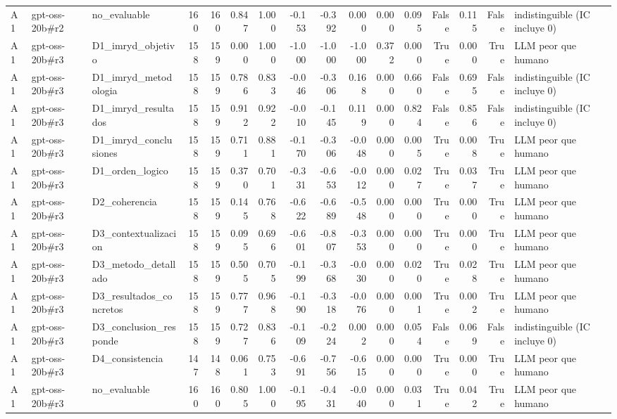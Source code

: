 \begin{table}
{\begin{tabular}{lllrrrrrrrrrrrrl}
A1 & gpt-oss-20b\#r2 & no\_evaluable & 160 & 160 & 0.847 & 1.000 & -0.153 & -0.392 & 0.000 & 0.000 & 0.095 & False & 0.115 & False & indistinguible (IC incluye 0) \\
A1 & gpt-oss-20b\#r3 & D1\_imryd\_objetivo & 158 & 159 & 0.000 & 1.000 & -1.000 & -1.000 & -1.000 & 0.372 & 0.000 & True & 0.000 & True & LLM peor que humano \\
A1 & gpt-oss-20b\#r3 & D1\_imryd\_metodologia & 158 & 159 & 0.786 & 0.833 & -0.046 & -0.306 & 0.168 & 0.000 & 0.660 & False & 0.695 & False & indistinguible (IC incluye 0) \\
A1 & gpt-oss-20b\#r3 & D1\_imryd\_resultados & 158 & 159 & 0.912 & 0.922 & -0.010 & -0.145 & 0.119 & 0.000 & 0.824 & False & 0.856 & False & indistinguible (IC incluye 0) \\
A1 & gpt-oss-20b\#r3 & D1\_imryd\_conclusiones & 158 & 159 & 0.711 & 0.881 & -0.170 & -0.306 & -0.048 & 0.000 & 0.005 & True & 0.008 & True & LLM peor que humano \\
A1 & gpt-oss-20b\#r3 & D1\_orden\_logico & 158 & 159 & 0.370 & 0.701 & -0.331 & -0.653 & -0.012 & 0.000 & 0.027 & True & 0.037 & True & LLM peor que humano \\
A1 & gpt-oss-20b\#r3 & D2\_coherencia & 158 & 159 & 0.145 & 0.768 & -0.622 & -0.689 & -0.548 & 0.000 & 0.000 & True & 0.000 & True & LLM peor que humano \\
A1 & gpt-oss-20b\#r3 & D3\_contextualizacion & 158 & 159 & 0.095 & 0.696 & -0.601 & -0.807 & -0.353 & 0.000 & 0.000 & True & 0.000 & True & LLM peor que humano \\
A1 & gpt-oss-20b\#r3 & D3\_metodo\_detallado & 158 & 159 & 0.505 & 0.705 & -0.199 & -0.368 & -0.030 & 0.000 & 0.020 & True & 0.028 & True & LLM peor que humano \\
A1 & gpt-oss-20b\#r3 & D3\_resultados\_concretos & 158 & 159 & 0.777 & 0.968 & -0.190 & -0.318 & -0.076 & 0.000 & 0.001 & True & 0.002 & True & LLM peor que humano \\
A1 & gpt-oss-20b\#r3 & D3\_conclusion\_responde & 158 & 159 & 0.727 & 0.836 & -0.109 & -0.224 & 0.002 & 0.000 & 0.054 & False & 0.069 & False & indistinguible (IC incluye 0) \\
A1 & gpt-oss-20b\#r3 & D4\_consistencia & 147 & 148 & 0.061 & 0.753 & -0.691 & -0.756 & -0.615 & 0.000 & 0.000 & True & 0.000 & True & LLM peor que humano \\
A1 & gpt-oss-20b\#r3 & no\_evaluable & 160 & 160 & 0.805 & 1.000 & -0.195 & -0.431 & -0.040 & 0.000 & 0.031 & True & 0.042 & True & LLM peor que humano \\

\end{tabular}}
\end{table}
